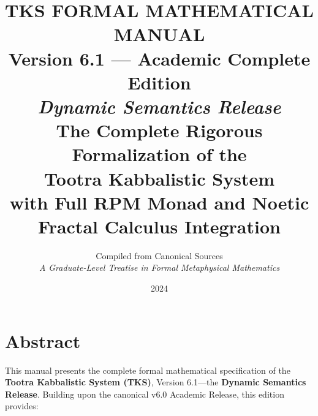 \documentclass[11pt,twoside,openright]{book}
\title{%
  \Huge\bfseries TKS FORMAL MATHEMATICAL MANUAL\\[0.5em]
  \Large Version 6.1 — Academic Complete Edition\\[0.5em]
  \large\textit{Dynamic Semantics Release}\\[1em]
  \normalsize The Complete Rigorous Formalization of the\\
  Tootra Kabbalistic System\\[0.5em]
  with Full RPM Monad and Noetic Fractal Calculus Integration
}
\author{%
  Compiled from Canonical Sources\\[0.5em]
  \textit{A Graduate-Level Treatise in Formal Metaphysical Mathematics}
}
\date{2024}
\theoremstyle{definition}
\theoremstyle{plain}
\theoremstyle{remark}
\begin{document}
\frontmatter
\maketitle

\chapter*{Abstract}

This manual presents the complete formal mathematical specification of the \textbf{Tootra Kabbalistic System (TKS)}, Version 6.1---the \textbf{Dynamic Semantics Release}. Building upon the canonical v6.0 Academic Release, this edition provides:
\end{document}
